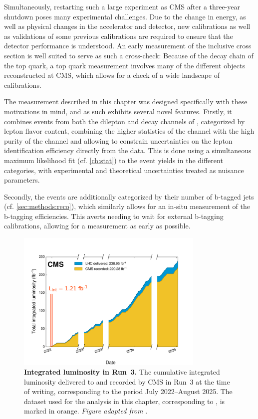 Simultaneously, restarting such a large experiment as CMS after a three-year shutdown poses many experimental challenges. Due to the change in energy, as well as physical changes in the accelerator and detector, new calibrations as well as validations of some previous calibrations are required to ensure that the detector performance is understood. An early measurement of the inclusive \ttbar cross section is well suited to serve as such a cross-check: Because of the decay chain of the top quark, a top quark measurement involves many of the different objects reconstructed at CMS, which
allows for a check of a wide landscape of calibrations.

The measurement described in this chapter was designed specifically with these motivations in mind, and as such exhibits several novel features. Firstly, it combines events from both the dilepton and \ljets decay channels of \ttbar, categorized by lepton flavor content, combining the higher statistics of the \ljets channel with the high purity of the \emu channel and allowing to constrain uncertainties on the lepton identification efficiency directly from the data. This is done using a simultaneous maximum likelihood fit (cf. \cref{ch:stat}) to the event yields in the different categories, with experimental and theoretical uncertainties treated as nuisance parameters.

Secondly, the events are additionally categorized by their number of b-tagged jets (cf. \cref{sec:methods:reco}), which similarly allows for an in-situ measurement of the b-tagging efficiencies. This averts needing to wait for external b-tagging calibrations, allowing for a measurement as early as possible.

\begin{figure}[!t]
    \centering
    \includegraphics[width=0.8\textwidth]{figures/ttxs/lumiplot_thesis.pdf}
    \caption{\textbf{Integrated luminosity in Run~3.} The cumulative integrated luminosity delivered to and recorded by CMS in Run~3 at the time of writing, corresponding to the period July 2022--August 2025. The dataset used for the analysis in this chapter, corresponding to \lumiRIII, is marked in orange. \textit{Figure adapted from }.}
    \label{fig:ttxs:lumi}
\end{figure}

